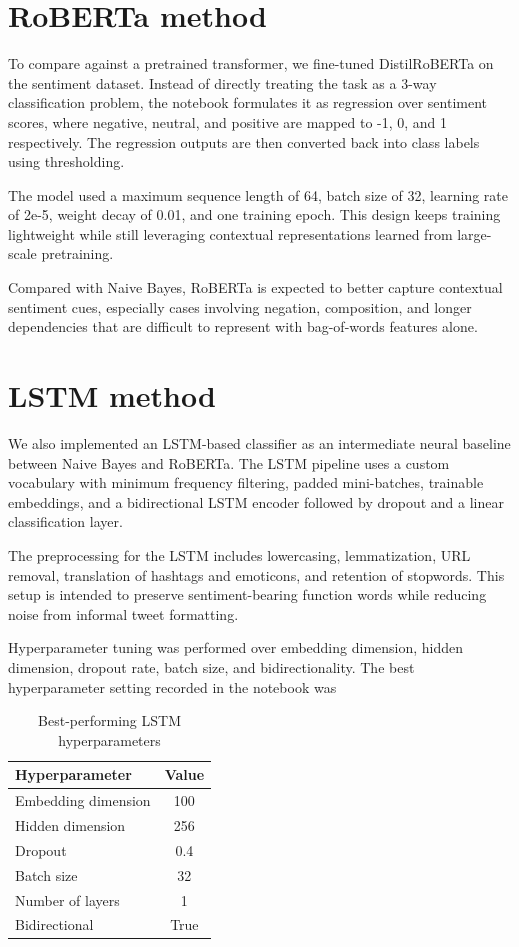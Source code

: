 \documentclass[11pt]{article}
\begin{document}
\section{RoBERTa method}

To compare against a pretrained transformer, we fine-tuned DistilRoBERTa on the sentiment dataset. Instead of directly treating the task as a 3-way classification problem, the notebook formulates it as regression over sentiment scores, where negative, neutral, and positive are mapped to -1, 0, and 1 respectively. The regression outputs are then converted back into class labels using thresholding.

The model used a maximum sequence length of 64, batch size of 32, learning rate of 2e-5, weight decay of 0.01, and one training epoch. This design keeps training lightweight while still leveraging contextual representations learned from large-scale pretraining.

Compared with Naive Bayes, RoBERTa is expected to better capture contextual sentiment cues, especially cases involving negation, composition, and longer dependencies that are difficult to represent with bag-of-words features alone.


\section{LSTM method}

We also implemented an LSTM-based classifier as an intermediate neural baseline between Naive Bayes and RoBERTa. The LSTM pipeline uses a custom vocabulary with minimum frequency filtering, padded mini-batches, trainable embeddings, and a bidirectional LSTM encoder followed by dropout and a linear classification layer.

The preprocessing for the LSTM includes lowercasing, lemmatization, URL removal, translation of hashtags and emoticons, and retention of stopwords. This setup is intended to preserve sentiment-bearing function words while reducing noise from informal tweet formatting.

Hyperparameter tuning was performed over embedding dimension, hidden dimension, dropout rate, batch size, and bidirectionality. The best hyperparameter setting recorded in the notebook was 

\begin{table}[h]
\centering
\begin{tabular}{lc}
\hline
\textbf{Hyperparameter} & \textbf{Value} \\
\hline
Embedding dimension & 100 \\
Hidden dimension & 256 \\
Dropout & 0.4 \\
Batch size & 32 \\
Number of layers & 1 \\
Bidirectional & True \\
\hline
\end{tabular}
\caption{Best-performing LSTM hyperparameters}
\end{table}
\end{document}
